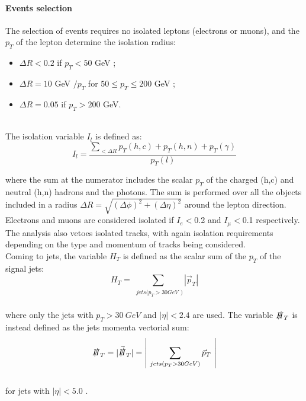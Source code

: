 \documentclass[12pt,A4paper
english, %
singlespacing, %
parskip, %
headsepline, %
]{article}
\begin{document}
\paragraph{Events selection}
\newline
The selection of events requires no isolated leptons (electrons or muons), and the $p_T$ of the lepton determine the isolation radius:
\begin{itemize}
\item $\Delta R < 0.2 $ if $p_T < 50$ GeV ; \
\item $\Delta R = 10$ GeV $ / p_T $ for $ 50 \leq p_T \leq  200$ GeV ; \
\item $\Delta R = 0.05$ if $p_T >200$ GeV.
\end{itemize}
\\
 
The isolation variable $I_l$ is defined as:
\begin{equation*}
I_l = \frac{\sum _{< \Delta R} p_T(h,c) + p_T(h,n) + p_T(\gamma) } {p_T(l) }
\end{equation*}
 
where the sum at the numerator includes the scalar $p_T$ of the charged (h,c) and neutral (h,n) hadrons and the photons. The sum is performed over all the objects included in a radius  $\Delta R = \sqrt{ (\Delta \phi)^2 + (\Delta \eta)^2 }$ around the lepton direction. 
\\
 
Electrons and muons are considered isolated if $I_e <$0.2 and $I_{\mu} <$0.1 respectively. The analysis also vetoes isolated tracks, with again isolation requirements depending on the type and momentum of tracks being considered.
\\
 
Coming to jets, the variable $H_T$ is defined as the scalar sum of the $p_T$ of the signal jets:
\begin{equation}
H_T = \sum_{\substack{jets (p_T> 30 GeV})}  | \vec{p}_T | 
\end{equation}
\\
where only the jets with $p_T>30 \ GeV$ and $|\eta| < 2.4$ are used.
The variable $\slashed {H}_T$ is instead defined as the jets momenta vectorial sum:
\begin{equation}
\slashed {H}_T = | \vec{\slashed {H}}_T | =  \left | \ \sum_{\substack{jets (p_T> 30 GeV)}}  \vec{p}_T \ \right |
\end{equation}
\\
for jets with $|\eta| < 5.0$ . 
\\
\end{document}
